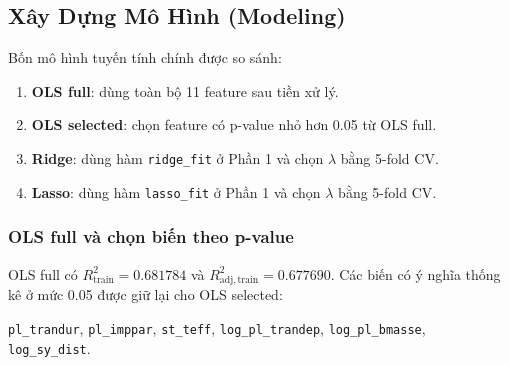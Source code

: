 ﻿\subsection{Xây Dựng Mô Hình (Modeling)}


Bốn mô hình tuyến tính chính được so sánh:
\begin{enumerate}
    \item \textbf{OLS full}: dùng toàn bộ 11 feature sau tiền xử lý.
    \item \textbf{OLS selected}: chọn feature có p-value nhỏ hơn 0.05 từ OLS full.
    \item \textbf{Ridge}: dùng hàm \texttt{ridge\_fit} ở Phần 1 và chọn $\lambda$ bằng 5-fold CV.
    \item \textbf{Lasso}: dùng hàm \texttt{lasso\_fit} ở Phần 1 và chọn $\lambda$ bằng 5-fold CV.
\end{enumerate}

\subsubsection{OLS full và chọn biến theo p-value}

OLS full có $R^2_{\mathrm{train}} = 0.681784$ và
$R^2_{\mathrm{adj,train}} = 0.677690$. Các biến có ý nghĩa thống kê ở mức 0.05 được giữ lại cho
OLS selected:
\begin{center}
\texttt{pl\_trandur}, \texttt{pl\_imppar}, \texttt{st\_teff},
\texttt{log\_pl\_trandep}, \texttt{log\_pl\_bmasse}, \texttt{log\_sy\_dist}.
\end{center}

